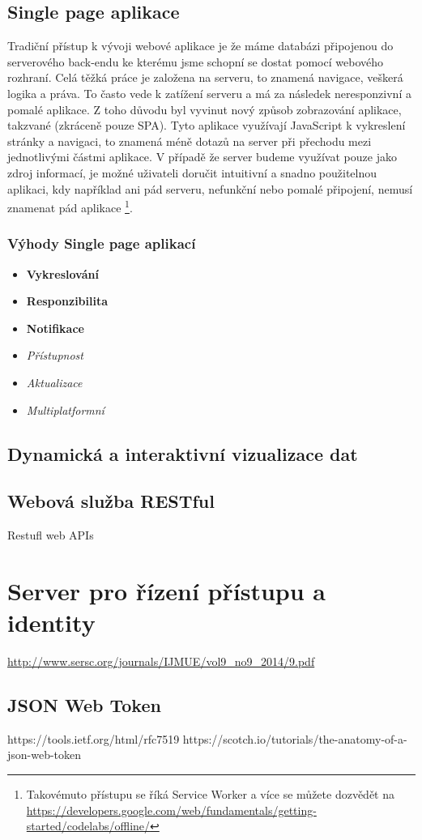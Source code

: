 \subsection{Single page aplikace}
\par Tradiční přístup k vývoji webové aplikace je že máme databázi připojenou do serverového back-endu ke kterému jsme schopní se dostat pomocí webového rozhraní. Celá těžká práce je založena na serveru, to znamená navigace, veškerá logika a práva. To často vede k zatížení serveru a má za následek neresponzivní a pomalé aplikace. Z toho důvodu byl vyvinut nový způsob zobrazování aplikace, takzvané  (zkráceně pouze SPA). Tyto aplikace využívají JavaScript k vykreslení stránky a navigaci, to znamená méně dotazů na server při přechodu mezi jednotlivými částmi aplikace. V případě že server budeme využívat pouze jako zdroj informací, je možné uživateli doručit intuitivní a snadno použitelnou aplikaci, kdy například ani pád serveru, nefunkční nebo pomalé připojení, nemusí znamenat pád aplikace \footnote{Takovémuto přístupu se říká Service Worker a více se můžete dozvědět na \url{https://developers.google.com/web/fundamentals/getting-started/codelabs/offline/}}. \cite{serverless-singlepage-apps}

\subsubsection{Výhody Single page aplikací}
\begin{itemize}
  \item \textbf{Vykreslování}
  \item \textbf{Responzibilita}
  \item \textbf{Notifikace}
  \item \textit{Přístupnost}
  \item \textit{Aktualizace}
  \item \textit{Multiplatformní}  \cite{SPA}
\end{itemize}
\subsection{Dynamická a interaktivní vizualizace dat}
\subsection{Webová služba RESTful}
Restufl web APIs

\section{Server pro řízení přístupu a identity}
\url{http://www.sersc.org/journals/IJMUE/vol9_no9_2014/9.pdf}

\subsection{JSON Web Token}
https://tools.ietf.org/html/rfc7519
https://scotch.io/tutorials/the-anatomy-of-a-json-web-token
